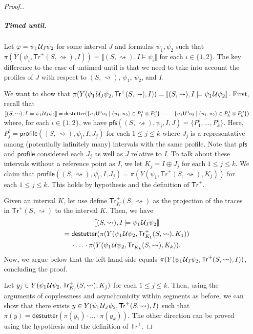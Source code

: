 \documentclass[iicol,lineno]{sn-jnl}
\newcommand{\hb}{\rightsquigarrow}
\newcommand{\tr}{\mathsf{Tr}}
\newcommand{\destutter}{\mathsf{destutter}}
\def\until{\kern.1em\mathcal{U}}
\newcommand{\?}{\text{?}}
\newcommand{\suchthat}{\;\ifnum\currentgrouptype=16 \middle\fi|\;}
\let\st\suchthat
\begin{document}
\begin{proof}[\normalsize Proof.]
		\subparagraph*{Timed until.}
		Let $\varphi = \psi_1 \until_J \psi_2$ for some interval $J$ and formulas $\psi_1, \psi_2$ such that $\pi(Y(\psi_i, \tr^+(S,{\hb}), I)) = \llbracket (S,{\hb}), I \models \psi_i \rrbracket$ for each $i \in \{1,2\}$.
		The key difference to the case of untimed until is that we need to take into account the profiles of $J$ with respect to $(S,{\hb})$, $\psi_1$, $\psi_2$, and $I$.
		
		We want to show that $\pi(Y(\psi_1 \until_J \psi_2, \tr^+(S,{\hb}), I)) = \llbracket (S,{\hb}), I \models \psi_1 \until \psi_2 \rrbracket$.
		First, recall that $\llbracket (S,{\hb}), I \models \psi_1 \until_J \psi_2 \rrbracket = \destutter( \{ u_1 \mathsf{U}^0 u_2 \st (u_1, u_2) \in P^1_1 \otimes P^2_1 \} \cdot \ldots \cdot \{ u_1 \mathsf{U}^0 u_2 \st (u_1, u_2) \in P^1_k \otimes P^2_k \} )$ where, for each $i \in \{1,2\}$, we have $\mathsf{pfs}((S,{\hb}), \psi_i, I, J) = \{P^i_1, \ldots, P^i_k\}$.
		Here, $P^i_j = \mathsf{profile}((S,{\hb}), \psi_i, I, J_j)$ for each $1 \leq j \leq k$ where $J_j$ is a representative among (potentially infinitely many) intervals with the same profile.
		Note that $\mathsf{pfs}$ and $\mathsf{profile}$ considered each $J_j$ as well as $J$ relative to $I$.
		To talk about these intervals without a reference point as $I$, we let $K_j = I \oplus J_j$ for each $1 \leq j \leq k$.
		We claim that $\mathsf{profile}((S,{\hb}), \psi_i, I, J_j) = \pi(Y(\psi_1, \tr^+(S,{\hb}), K_j))$ for each $1 \leq j \leq k$.
		This holds by hypothesis and the definition of $\tr^+$.
		
		Given an interval $K$, let use define $\tr^+_K(S,{\hb})$ as the projection of the traces in $\tr^+(S,{\hb})$ to the interval $K$.
		Then, we have
		\begin{multline*}
			\llbracket (S,{\hb}), I \models \psi_1 \until_J \psi_2 \rrbracket \\
			= \destutter( \pi(Y(\psi_1 \until \psi_2, \tr^+_{K_1}(S,{\hb}), K_1)) \\
			\cdot \ldots \cdot \pi(Y(\psi_1 \until \psi_2, \tr^+_{K_k}(S,{\hb}), K_k)).
		\end{multline*}
		Now, we argue below that the left-hand side equals $\pi(Y(\psi_1 \until_J \psi_2, \tr^+(S,{\hb}), I ))$, concluding the proof.
		
		Let $y_j \in Y(\psi_1 \until \psi_2, \tr^+_{K_j}(S,{\hb}), K_j)$ for each $1 \leq j \leq k$.
		Then, using the arguments of copylessness and asynchronicity within segments as before, we can show that there exists $y \in Y(\psi_1 \until_J \psi_2, \tr^+(S,{\hb}), I)$ such that $\pi(y) = \destutter( \pi(y_1) \cdot \ldots \cdot \pi(y_k) )$.
		The other direction can be proved using the hypothesis and the definition of $\tr^+$.
	\end{proof}
	
\end{document}
